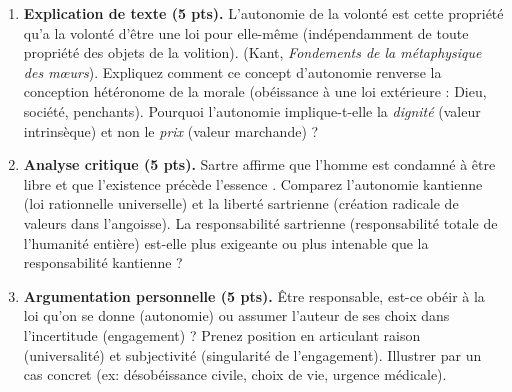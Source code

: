 \documentclass[11pt]{article}
\begin{document}
\begin{exercice}
\begin{enumerate}
    \item \textbf{Explication de texte (5 pts).} \og L'autonomie de la volonté est cette propriété qu'a la volonté d'être une loi pour elle-même (indépendamment de toute propriété des objets de la volition). \fg{} (Kant, \textit{Fondements de la métaphysique des mœurs}). Expliquez comment ce concept d'autonomie renverse la conception hétéronome de la morale (obéissance à une loi extérieure : Dieu, société, penchants). Pourquoi l'autonomie implique-t-elle la \textit{dignité} (valeur intrinsèque) et non le \textit{prix} (valeur marchande) ?
    \item \textbf{Analyse critique (5 pts).} Sartre affirme que \og l'homme est condamné à être libre \fg{} et que \og l'existence précède l'essence \fg{}. Comparez l'autonomie kantienne (loi rationnelle universelle) et la liberté sartrienne (création radicale de valeurs dans l'angoisse). La responsabilité sartrienne (\og responsabilité totale \fg{} de l'humanité entière) est-elle plus exigeante ou plus intenable que la responsabilité kantienne ?
    \item \textbf{Argumentation personnelle (5 pts).} \og Être responsable, est-ce obéir à la loi qu'on se donne (autonomie) ou assumer l'auteur de ses choix dans l'incertitude (engagement) ? \fg{} Prenez position en articulant raison (universalité) et subjectivité (singularité de l'engagement). Illustrer par un cas concret (ex: désobéissance civile, choix de vie, urgence médicale).
\end{enumerate}
\end{exercice}
\end{document}
